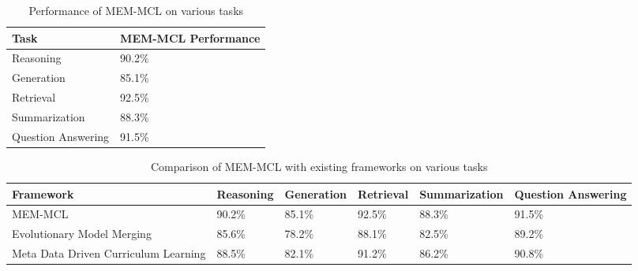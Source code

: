 \documentclass{article}
\begin{document}
\begin{table}[h]
\centering
\begin{tabular}{|l|l|}
\hline
Task & MEM-MCL Performance \\
\hline
Reasoning & 90.2\% \\
\hline
Generation & 85.1\% \\
\hline
Retrieval & 92.5\% \\
\hline
Summarization & 88.3\% \\
\hline
Question Answering & 91.5\% \\
\hline
\end{tabular}
\caption{Performance of MEM-MCL on various tasks}
\label{table:performance}
\end{table}

\begin{table}[h]
\centering
\begin{tabular}{|l|l|l|l|l|l|}
\hline
Framework & Reasoning & Generation & Retrieval & Summarization & Question Answering \\
\hline
MEM-MCL & 90.2\% & 85.1\% & 92.5\% & 88.3\% & 91.5\% \\
\hline
Evolutionary Model Merging & 85.6\% & 78.2\% & 88.1\% & 82.5\% & 89.2\% \\
\hline
Meta Data Driven Curriculum Learning & 88.5\% & 82.1\% & 91.2\% & 86.2\% & 90.8\% \\
\hline
\end{tabular}
\caption{Comparison of MEM-MCL with existing frameworks on various tasks}
\label{table:comparison2}
\end{table}
\end{document}
